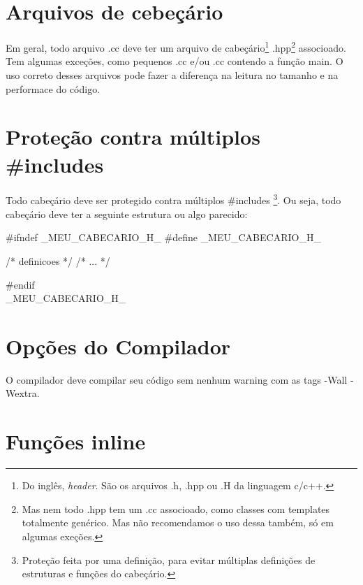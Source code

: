 \documentclass{article}
\begin{document}
\section{Arquivos de cebeçário}

Em geral, todo arquivo .cc deve ter um arquivo de cabeçário\footnote{Do inglês, \emph{header}. São os arquivos .h, .hpp ou .H da linguagem c/c++.} .hpp\footnote{Mas nem todo .hpp tem um .cc associoado, como classes com templates totalmente genérico. Mas não recomendamos o uso dessa também, só em algumas exeções.} associoado. Tem algumas exceções, como pequenos .cc e/ou .cc contendo a função main. O uso correto desses arquivos pode fazer a diferença na leitura no tamanho e na performace do código.

\section{Proteção contra múltiplos \#includes}

Todo cabeçário deve ser protegido contra  múltiplos \#includes \footnote{Proteção feita por uma definição, para evitar múltiplas definições de estruturas e funções do cabeçário.}. Ou seja, todo cabeçário deve ter a seguinte estrutura ou algo parecido:

\begin{code}
#ifndef _MEU_CABECARIO_H_
#define _MEU_CABECARIO_H_

/*	definicoes	*/
/*	   ...   	*/

#endif \\_MEU_CABECARIO_H_

\end{code}

\section{Opções do Compilador}

O compilador deve compilar seu código sem nenhum warning com as tags -Wall -Wextra.

\section{Funções inline}
\end{document}
